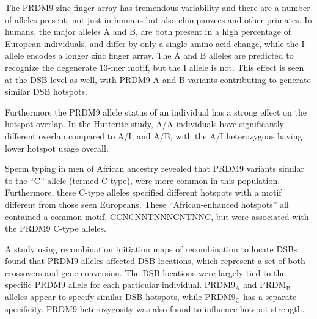 The PRDM9 zinc finger array has tremendous variability and there are a number of alleles present, not just in humans but also chimpanzees and other primates\cite{Schwartz2014}.
In humans, the major alleles A and B, are both present in a high percentage of European individuals, and differ by only a single amino acid change, while the I allele encodes a longer zinc finger array\cite{Baudat2010}.
The A and B alleles are predicted to recognize the degenerate 13-mer motif, but the I allele is not\cite{Baudat2010}.
This effect is seen at the DSB-level as well, with PRDM9 A and B variants contributing to generate similar DSB hotspots\cite{Pratto2014}.

Furthermore the PRDM9 allele status of an individual has a strong effect on the hotspot overlap.
In the Hutterite study, A/A individuals have significantly different overlap compared to A/I, and A/B, with the A/I heterozygous having lower hotspot usage overall\cite{Baudat2010}.

Sperm typing in men of African ancestry revealed that PRDM9 variants similar to the ``C'' allele (termed C-type), were more common in this population.
Furthermore, these C-type alleles specified different hotspots with a motif different from those seen Europeans\cite{Berg2011}. 
These ``African-enhanced hotspots'' all contained a common motif, CCNCNNTNNNCNTNNC, but were associated with the PRDM9 C-type alleles.

A study using recombination initiation maps of recombination to locate DSBs found that PRDM9 alleles affected DSB locations, which represent a set of both crossovers and gene conversion\cite{Pratto2014}.
The DSB locations were largely tied to the specific PRDM9 allele for each particular individual.
PRDM9$_\text{A}$ and PRDM$_\text{B}$ alleles appear to specify similar DSB hotspots, while PRDM9$_\text{C}$ has a separate specificity.
PRDM9 heterozygosity was also found to influence hotspot strength.




